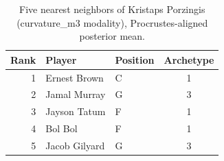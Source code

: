 \begin{table}[htbp]
  \centering\small
  \begin{tabular}{rllc}
    \toprule
    Rank & Player & Position & Archetype \\
    \midrule
    1 & Ernest Brown & C & 1 \\
    2 & Jamal Murray & G & 3 \\
    3 & Jayson Tatum & F & 1 \\
    4 & Bol Bol & F & 1 \\
    5 & Jacob Gilyard & G & 3 \\
    \bottomrule
  \end{tabular}
  \caption{Five nearest neighbors of Kristaps Porzingis (curvature_m3 modality), Procrustes-aligned posterior mean.}
  \label{tab:Kristaps_Porzingis_neighbors_curvature_m3}
\end{table}

